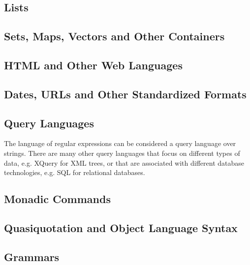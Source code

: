 {{ 


\subsection{Lists}\label{sec:syntax-examples-lists}
\subsection{Sets, Maps, Vectors and Other Containers}\label{sec:syntax-examples-containers}
\subsection{HTML and Other Web Languages}\label{sec:syntax-examples-html}
\subsection{Dates, URLs and Other Standardized Formats}\label{sec:syntax-examples-dates}
\subsection{Query Languages} The language of regular expressions can be considered a query language over strings. There are many other query languages that focus on different types of data, e.g. XQuery for XML trees, or that are associated with different database technologies, e.g. SQL for relational databases.  
\subsection{Monadic Commands}\label{sec:syntax-examples-monads}
\subsection{Quasiquotation and Object Language Syntax}\label{sec:syntax-examples-quasiquotation}
\subsection{Grammars}\label{sec:syntax-examples-grammars}
}}
